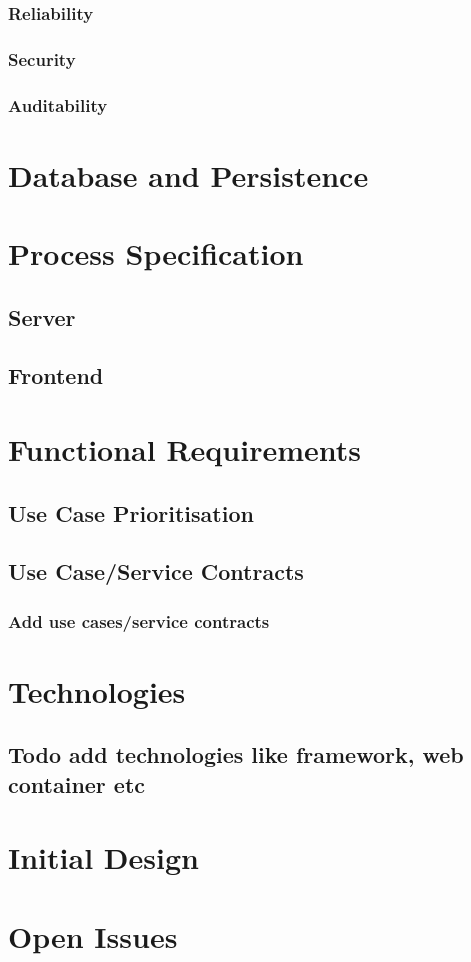 \documentclass{article}
\begin{document}
\subsubsection{Reliability}

\subsubsection{Security}

\subsubsection{Auditability}

\section{Database and Persistence}

\section{Process Specification}

\subsection{Server}

\subsection{Frontend}

\section{Functional Requirements}

\subsection{Use Case Prioritisation}

\subsection{Use Case/Service Contracts}

\subsubsection{Add use cases/service contracts}

\section{Technologies}

\subsection{Todo add technologies like framework, web container etc}

\section{Initial Design}

\section{Open Issues}
\end{document}
